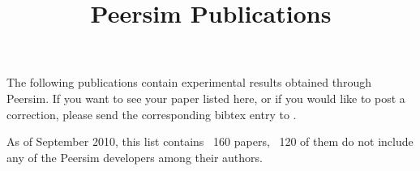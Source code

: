 \documentclass{article}
\begin{document}
\title{Peersim Publications}

The following publications contain experimental results obtained through
Peersim. If you want to see your paper listed here, or if you would
like to post a correction, please send the corresponding bibtex entry 
to .

As of September 2010, this list contains ~160 papers, ~120 of them do not include any of the Peersim developers among their authors.

\nocite{*}



\end{document}
